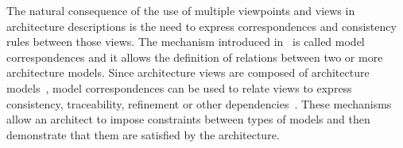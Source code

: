 


The natural consequence of the use of multiple viewpoints and views in architecture
descriptions is the need to express correspondences and consistency rules between those views.
The mechanism introduced in~\cite{42010} is called model correspondences and it allows the definition of relations between
two or more architecture models. Since architecture views are composed of architecture models~\cite{42010}, model correspondences can be used to
relate views to express consistency, traceability, refinement or other dependencies~\cite{Emery-Hilliard:2009}.
These mechanisms allow an architect to impose constraints between types of models and then demonstrate that them
are satisfied by the architecture. 






%
%
%





